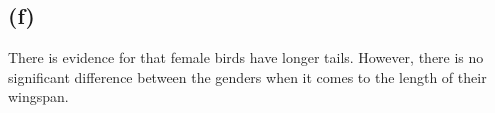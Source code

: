\message{ !name(examination.tex)}\documentclass[one column]{report}
\begin{document}
\subsection*{(f)}
\label{sec:f}
There is evidence for that female birds have longer tails. However,
there is no significant difference between the genders when it comes to
the length of their wingspan. 



\end{document}
